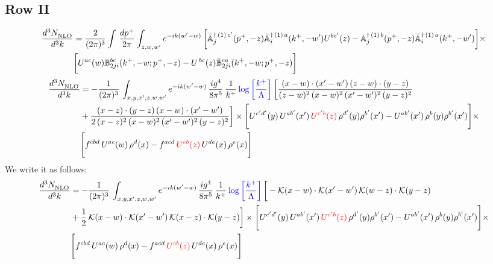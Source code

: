 \documentclass[9pt]{article}
\def\mf#1{\mathbb{#1}}
\newcommand{\chg}[1]{{\color{red}#1}}
\numberwithin{equation}{section}
\begin{document}
\subsection{Row II}
\begin{align}
    \frac{d^{3}N_{\rm NLO}^{\rm}}{d^{3}k}  & =    \frac{2}{(2\pi)^{3}} \int\, \frac{dp^{+}}{2\pi}\int_{z,w,w^{\prime}} e^{-ik(w^{\prime}-w)}\,\bigg[\Bar{\mf{A}}^{\dagger\,(1)\, c^{\prime}}_{j}(p^{+},-z)\Bar{\mf{A}}^{\dagger\, (1)\, a}_{i}(k^{+},- w^{\prime})U^{bc^{\prime}}(z) - \mf{A}^{\dagger\, (1)\, b}_{j}(p^{+},- z)\Bar{\mf{A}}^{\dagger\, (1)\, a}_{i}(k^{+},- w^{\prime})\bigg] \times \notag \\ & \bigg[U^{ac}(w) \mf{B}^{bc}_{2ji}(k^{+},-w;p^{+},-z) -U^{\, bc}(z)\Bar{\mf{B}}^{ca}_{2ji}(k^{+},-w; p^{+},-z)\bigg] \nonumber
\end{align}
\begin{align}
 \frac{d^{3}N_{\rm NLO}^{\rm}}{d^{3}k}  & =    -\frac{1}{(2\pi)^{3}}\, \int_{x,y,x',z,w,w^{\prime}} e^{-ik(w^{\prime}-w)}\,\frac{ig^{4}}{8\pi^{5}}\,\frac{1}{k^{+}}\,{\color{blue}\log{\left[\frac{k^{+}}{\Lambda}\right]}}\,\bigg[\frac{(x-w)\cdot (x'-w')\,(z-w)\cdot (y-z)}{(z-w)^{2}\,(x-w)^{2}\,(x'-w')^{2}\,(y-z)^{2}}\notag \\ & +\frac{(x-z)\cdot (y-z)\,(x-w)\cdot (x'-w')}{2\,(x-z)^{2}\, (x-w)^{2}\,(x'-w')^{2}\,(y-z)^{2}}\bigg]\times\Bigg[U^{c'd'}(y)\,U^{ab'}(x')\,\chg{U^{c'b}(z)}\,\rho^{d'}(y)\rho^{b'}(x')-U^{ab'}(x')\,\rho^{b}(y)\rho^{b'}(x')\Bigg]\times\notag \\ & \Bigg[f^{cbd}\,U^{ac}(w)\,\rho^{d}(x)-f^{acd}\, \chg{U^{cb}(z)}\,U^{de}(x)\,\rho^{e}(x)\Bigg]
\end{align}
We write it as follows:
\begin{align}
 \frac{d^{3}N_{\rm NLO}^{\rm}}{d^{3}k}  & =    -\frac{1}{(2\pi)^{3}}\, \int_{x,y,x',z,w,w^{\prime}} e^{-ik(w^{\prime}-w)}\,\frac{ig^{4}}{8\pi^{5}}\,\frac{1}{k^{+}}\,{\color{blue}\log{\left[\frac{k^{+}}{\Lambda}\right]}}\,\bigg[-\mathcal{K}(x-w)\cdot \mathcal{K}(x'-w')\, \mathcal{K}(w-z)\cdot \mathcal{K}(y-z)\notag \\ & +\frac{1}{2}\,\mathcal{K}(x-w)\cdot \mathcal{K}(x'-w')\, \mathcal{K}(x-z)\cdot \mathcal{K}(y-z)\bigg]\times\Bigg[U^{c'd'}(y)\,U^{ab'}(x')\,\chg{U^{c'b}(z)}\,\rho^{d'}(y)\rho^{b'}(x')-U^{ab'}(x')\,\rho^{b}(y)\rho^{b'}(x')\Bigg]\times\notag \\ & \Bigg[f^{cbd}\,U^{ac}(w)\,\rho^{d}(x)-f^{acd}\, \chg{U^{cb}(z)}\,U^{de}(x)\,\rho^{e}(x)\Bigg]
\end{align}
\end{document}
